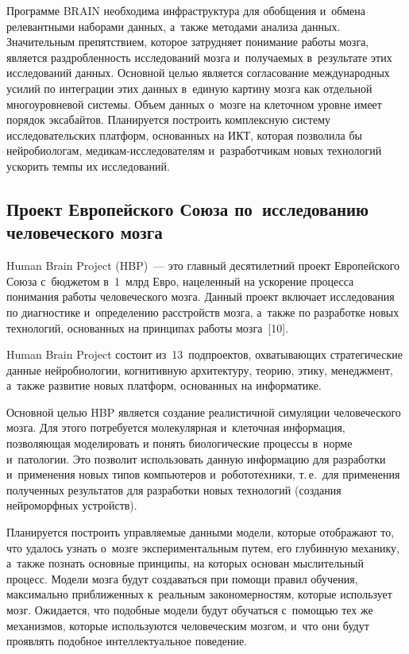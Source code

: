 \begin{multicols}{2}
  Программе BRAIN необходима инфраструктура для обобщения и~обмена релевантными 
наборами данных, а~также методами анализа данных. Значительным препятствием, 
которое затрудняет понимание работы мозга, является раздробленность исследований 
мозга и~получаемых в~результате этих исследований данных. Основной целью является 
согласование международных усилий по интеграции этих данных в~единую картину мозга 
как отдельной многоуровневой системы. Объем данных о~мозге на клеточном уровне 
имеет порядок эксабайтов. Планируется построить комплексную систему 
исследовательских платформ, основанных на ИКТ, которая позволила бы нейробиологам, 
ме\-ди\-кам-ис\-сле\-до\-ва\-те\-лям и~разработчикам новых технологий ускорить темпы их 
исследований. 
  
\subsection{Проект Европейского Союза по~исследованию человеческого мозга}

  Human Brain Project (HBP)~--- это главный десятилетний проект Европейского Союза с~бюджетом 
  в~1~млрд Евро, нацеленный на ускорение процесса понимания работы человеческого 
мозга. Данный проект включает исследования по диагностике и~определению расстройств 
мозга, а~также по разработке новых технологий, основанных на принципах работы 
мозга~[10]. 
  
  Human Brain Project состоит из~13~подпроектов, охватывающих стратегические данные 
нейробиологии, когнитивную архитектуру, теорию, этику, менеджмент, а~так\-же развитие 
новых платформ, основанных на информатике.
  
    Основной целью HBP является создание реалистичной симуляции человеческого мозга. 
Для этого потребуется молекулярная и~клеточная информация, позволяющая моделировать 
и понять биологические процессы в~норме и~патологии. Это позволит использовать 
данную информацию для разработки и~применения новых типов компьютеров 
и~робототехники, т.\,е.\ для применения полученных результатов для разработки новых 
технологий (создания нейроморфных устройств). 

    Планируется построить управляемые данными модели, которые отображают то, что 
удалось узнать о~мозге экспериментальным путем, его глубинную механику, а~также 
познать основные принципы, на которых основан мыслительный процесс. Модели мозга 
будут создаваться при помощи правил обучения, максимально приближенных к~реальным 
закономерностям, которые использует мозг. Ожидается, что подобные модели будут 
обучаться с~помощью тех же механизмов, которые используются человеческим мозгом, и~что 
они будут проявлять подобное интеллектуальное поведение.


\end{multicols}
